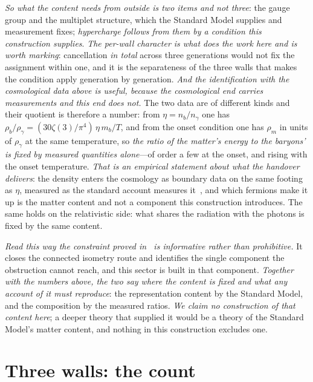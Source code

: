 \documentclass[11pt]{article}
\begin{document}
\emph{So what the content needs from outside is two items and not three}: the gauge group and the multiplet
structure, which the Standard Model supplies and measurement fixes; \emph{hypercharge follows from them by a
condition this construction supplies}. \emph{The per-wall character is what does the work here and is worth marking}: cancellation
\emph{in total} across three generations would not fix the assignment within one, and it is the separateness of
the three walls that makes the condition apply generation by generation.  \emph{And the identification with the cosmological data above is useful, because the cosmological end carries
measurements and this end does not.} The two data are of different kinds and their quotient is therefore a
number: from $\eta=n_b/n_\gamma$ one has $\rho_b/\rho_\gamma=(30\zeta(3)/\pi^{4})\,\eta\,m_b/T$, and from the
onset condition one has $\rho_m$ in units of $\rho_\gamma$ at the same temperature, so \emph{the ratio of the
matter's energy to the baryons' is fixed by measured quantities alone}---of order a few at the onset, and
rising with the onset temperature. \emph{That is an empirical statement about what the handover delivers}: the
density enters the cosmology as boundary data on the same footing as $\eta$, measured as the standard account
measures it~\cite{JanzenCRcosmology}, and which fermions make it up is the matter content and not a component
this construction introduces. The same holds on the relativistic side: what shares the radiation with the
photons is fixed by the same content.

\emph{Read this way the constraint proved in~\cite{JanzenBoundary} is informative rather than prohibitive.} It
closes the connected isometry route and identifies the single component the obstruction cannot reach, and this
sector is built in that component. \emph{Together with the numbers above, the two say where the content is fixed
and what any account of it must reproduce}: the representation content by the Standard
Model, and the composition by the measured ratios. \emph{We claim no construction of that content here}; a deeper
theory that supplied it would be a theory of the Standard Model's matter content, and nothing in this construction excludes one.

\section{Three walls: the count}\label{sec:count}
\end{document}

